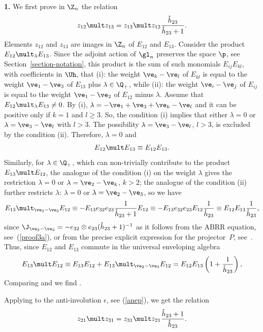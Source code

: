 \documentclass[11pt]{article}
\def\nplus{\mathfrak{n}}\def\nn{\nonumber}\def\nin{\noindent}
\def\s{z}\def\S{\mathrm {S}}\def\si{\sigma}\def\Sp{\S^{\nplus}}\def\sy{\acute{\sigma}}\def\th{\mathring{h}}
\numberwithin{equation}{section}
\begin{document}
{\bf 1.} We f\/irst prove in $\Z_n$ the relation
\begin{gather}\label{proof7}
\s_{12}\mult\s_{13}=\s_{13}\mult\s_{12}  \frac{\th_{23}}{\th_{23}+1}  .
\end{gather}
Elements $\s_{12}$ and $\s_{13}$ are images in $\Z_n$ of $E_{12}$ and $E_{13}$. Consider the
product $E_{12}\mult_\lambda E_{13}$. Since the adjoint action of $\gl_n$ preserves the space
$\p$, see Section~\ref{section-notation}, this product is the sum of such monomials $E_{ij}E_{kl}$,
with coef\/f\/icients in $\Uh$, that (i): the weight $\ve_k-\ve_l$
of $E_{kl}$ is equal to the weight $\ve_{1}-\ve_3$ of $E_{13}$ plus $\lambda\in\Q_+$, while (ii): the
weight $\ve_i-\ve_j$ of $E_{ij}$ is equal to the weight $\ve_{1}-\ve_2$ of $E_{12}$ minus
$\lambda$. Assume that $E_{12}\mult_\lambda E_{13}\neq 0$. By (i), $\lambda =-\ve_1+\ve_3+\ve_k-\ve_l$
and it can be positive only if $k=1$ and $l\geq 3$. So, the condition (i) implies that either
$\lambda=0$ or $\lambda=\ve_3-\ve_l$ with $l>3$. The possibility $\lambda=\ve_3-\ve_l$, $l>3$, is excluded
by the condition (ii). Therefore, $\lambda=0$ and
\begin{gather}
\label{proof8}
E_{12}\mult E_{13}\equiv E_{12}E_{13} .
\end{gather}
Similarly, for $\lambda\in\Q_+$, which can non-trivially contribute to the product $E_{13}\mult E_{12}$,
the analogue of the condition (i) on the weight $\lambda$ gives the
restriction $\lambda =0$ or $\lambda=\ve_2-\ve_k$, $k>2$; the analogue of the condition (ii)
further restricts $\lambda$:  $\lambda=0$ or $\lambda=\ve_2-\ve_3$, so we have
\begin{gather*}
E_{13}\mult_{\ve_2-\ve_3} E_{12}\equiv -E_{13}e_{32}e_{23}  \frac{1}{\th_{23}+1}E_{12}\equiv
-E_{13}e_{32}e_{23}E_{12}  \frac{1}{\th_{23}}\equiv E_{12}E_{13}  \frac{1}{\th_{23}}  ,
\end{gather*}
since $\J_{\ve_2-\ve_3}=-e_{32}\otimes e_{23}(\th_{23}+1)^{-1}$ as it follows from the ABRR
equation, see~(\ref{proof3a}), or from the precise explicit expression for the projector~$P$,
see~\cite{AST}. Thus, since $E_{12}$ and $E_{13}$ commute in the universal enveloping algebra
\begin{gather}\label{proof9}E_{13}\mult E_{12}\equiv E_{13}E_{12}+E_{13}\mult_{\ve_2-\ve_3} E_{12}=
E_{12}E_{13}\left(1+\frac{1}{\th_{23}}\right),
\end{gather}
Comparing  and  we f\/ind .


Applying to  the anti-involution $\epsilon$, see (\ref{anep}), we get the relation
\begin{gather}\label{proof10}
\s_{21}\mult\s_{31}=\s_{31}\mult\s_{21}  \frac{\th_{23}+1}{\th_{23}}  .
\end{gather}
\end{document}

